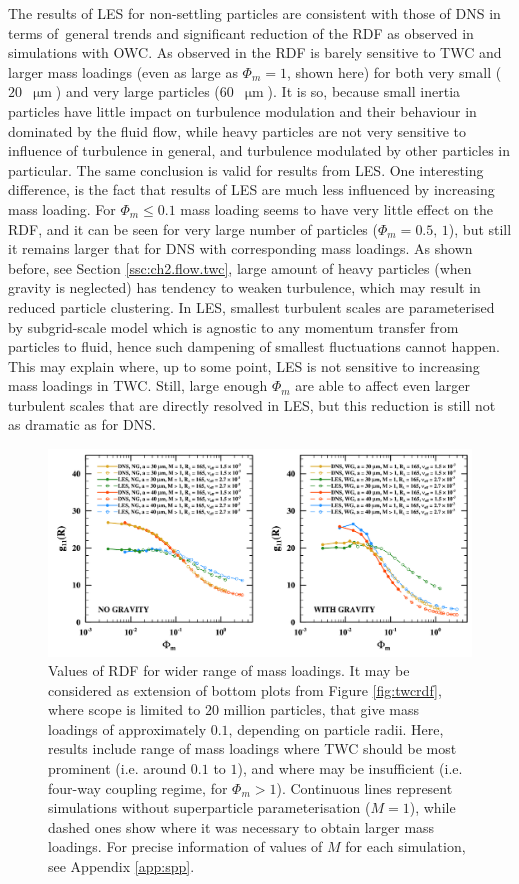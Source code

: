 \documentclass{pracamgren}
\begin{document}
The results of LES for non-settling particles are consistent with those of DNS in terms of~general trends and significant reduction of the RDF as observed in simulations with OWC.
As observed in \textcite{Rosa2020} the RDF is barely sensitive to TWC and larger mass loadings (even as large as $\Phi_m = 1$, shown here) for both very small ($20$~$\upmu\text{m}$) and very large particles ($60$~$\upmu\text{m}$).
It is so, because small inertia particles have little impact on turbulence modulation and their behaviour in dominated by the fluid flow, while heavy particles are not very sensitive to influence of turbulence in general, and turbulence modulated by other particles in particular.
The same conclusion is valid for results from LES.
One interesting difference, is the fact that results of LES are much less influenced by increasing mass loading.
For $\Phi_m \le 0.1$ mass loading seems to have very little effect on the RDF, and it can be seen for very large number of particles ($\Phi_m = 0.5, \, 1$), but still it remains larger that for DNS with corresponding mass loadings.
As shown before, see Section \ref{ssc:ch2.flow.twc}, large amount of heavy particles (when gravity is neglected) has tendency to weaken turbulence, which may result in reduced particle clustering.
In LES, smallest turbulent scales are parameterised by subgrid-scale model which is agnostic to any momentum transfer from particles to fluid, hence such dampening of smallest fluctuations cannot happen.
This may explain where, up to some point, LES is not sensitive to increasing mass loadings in TWC.
Still, large enough $\Phi_m$ are able to affect even larger turbulent scales that are directly resolved in LES, but this reduction is still not as dramatic as for DNS.

\begin{figure}[h]
\centering
\includegraphics[width=13.5cm]{img/plots/2-2-3b-twcrdfext.pdf}
\caption{
Values of RDF for wider range of mass loadings.
It may be considered as extension of bottom plots from Figure \ref{fig:twcrdf}, where scope is limited to $20$ million particles, that give mass loadings of approximately $0.1$, depending on particle radii.
Here, results include range of mass loadings where TWC should be most prominent (i.e. around $0.1$ to $1$), and where may be insufficient (i.e. four-way coupling regime, for $\Phi_m > 1$).
Continuous lines represent simulations without superparticle parameterisation ($M=1$), while dashed ones show where it was necessary to obtain larger mass loadings.
For precise information of values of $M$ for each simulation, see Appendix \ref{app:spp}. 
}
\label{fig:twcrdfext}
\end{figure}
\end{document}
